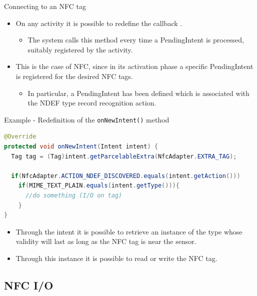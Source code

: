 \documentclass{beamer}
\begin{document}
  \begin{frame}{Connecting to an NFC tag}
    \begin{itemize}\itemsep10pt
      \item On any activity it is possible to redefine the callback
      .
      \begin{itemize}
        \item The system calls this method every time a PendingIntent is
        processed, suitably registered by the activity.
      \end{itemize}
      \item This is the case of NFC, since in its activation phase a specific
      PendingIntent is registered for the desired NFC tags.
      \begin{itemize}
        \item In particular, a PendingIntent has been defined which is
        associated with the NDEF type record recognition action.
      \end{itemize}
    \end{itemize}

    \begin{exampleblock}{Example - Redefinition of the \texttt{onNewIntent()} method}
      \begin{lstlisting}[language=Java]	
@Override
protected void onNewIntent(Intent intent) { 
  Tag tag = (Tag)intent.getParcelableExtra(NfcAdapter.EXTRA_TAG);
  
  if(NfcAdapter.ACTION_NDEF_DISCOVERED.equals(intent.getAction()))
    if(MIME_TEXT_PLAIN.equals(intent.getType())){
      //do something (I/O on tag)
    }
}
      \end{lstlisting}
    \end{exampleblock}
    \begin{itemize}
      \item Through the intent it is possible to retrieve an instance of the
       type whose validity will last as long as the NFC tag is near
      the sensor.
      \item Through this instance it is possible to read or write the NFC tag.
    \end{itemize}
  \end{frame}

\subsection{NFC I/O}
\end{document}
